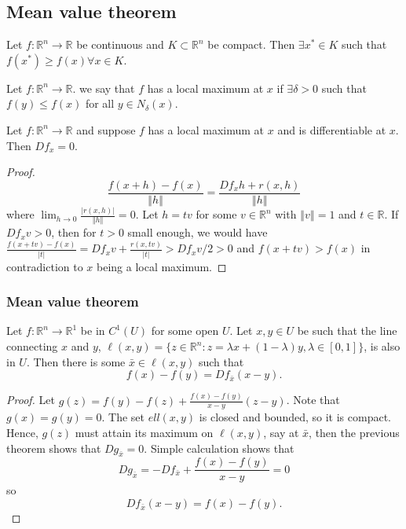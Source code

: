 \documentclass[compress]{beamer}
\def\R{\mathbb{R}}
\newcommand{\norm}[1]{\left\Vert {#1} \right\Vert}
\renewcommand{\to}{{\rightarrow}}
\begin{document}
\subsection{Mean value theorem}

\begin{frame}
  \begin{theorem}
    Let $f:\R^n \to \R$ be continuous and $K \subset \R^n$ be
    compact. Then $\exists x^* \in K$ such that $f(x^*) \geq f(x)
    \forall x \in K$. 
  \end{theorem}
  \begin{definition}
    Let $f: \R^n \to \R$. we say that $f$ has a local maximum at $x$ if
    $\exists \delta > 0$ such that $f(y) \leq f(x)$ for all $y \in
    N_\delta(x)$. 
  \end{definition}
\end{frame}

\begin{frame}
  \begin{theorem}
    Let $f: \R^n \to \R$ and suppose $f$ has a local maximum at $x$ and
    is differentiable at $x$. Then $Df_x = 0$. 
  \end{theorem}
  \begin{proof}
    \[ \frac{f(x+h) - f(x)}{\norm{h}} =\frac{ Df_x h +
      r(x,h)}{\norm{h}} \] where $\lim_{h \to 0}
    \frac{|r(x,h)|}{\norm{h}} = 0$. Let $h = t v$ for some $v \in \R^n$
    with $\norm{v} =1$ and $t \in \R$. If $D f_x v > 0$, then for $t>0$
    small enough, we would have $\frac{f(x+tv) - f(x)}{|t|} = D
    f_x v + \frac{r(x,tv)}{|t|} > D
    f_x v / 2 > 0$ and $f(x+tv)> f(x)$ in contradiction to $x$ being a
    local maximum. 
  \end{proof}
\end{frame}

\begin{frame}
  \frametitle{Mean value theorem}
  \begin{theorem}\label{thm:mvt}
    Let $f:\R^n \to \R^1$ be in $C^1(U)$ for some open $U$. Let $x, y
    \in U$ be such that the line connecting $x$ and $y$, $\ell(x,y) =
    \{z\in \R^n: z = \lambda x + (1-\lambda) y, \lambda \in [0,1]\}$, is
    also in $U$. Then there is some $\bar{x} \in \ell(x,y)$ such that
    \[ f(x) - f(y) = Df_{\bar{x}} (x-y). \]
  \end{theorem}
  \begin{proof}
    Let $g(z) = f(y) - f(z) + \frac{f(x) - f(y)}{x-y} (z - y)$. Note
    that $g(x) = g(y) = 0$. The set $ell(x,y)$ is closed and bounded,
    so it is compact. Hence, $g(z)$ must attain its maximum on
    $\ell(x,y)$, say at $\bar{x}$, then the previous theorem shows
    that $Dg_{\bar{x}} = 0$. Simple calculation shows that
    \[ Dg_{\bar{x}} = -Df_{\bar{x}} +  \frac{f(x) - f(y)}{x-y} = 0 \]
    so 
    \[ Df_{\bar{x}}(x-y) = f(x) - f(y). \]
  \end{proof}
\end{frame}
\end{document}
